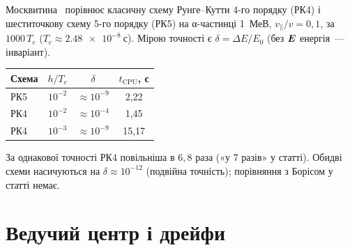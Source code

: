 \begin{corpusexample}
\noindent\begin{minipage}[c]{0.53\linewidth}
Москвитина~\cite{Moskvitina2010} порівнює класичну схему Рунге--Кутти 4-го порядку (РК4) і шеститочкову схему 5-го порядку (РК5) на α-частинці \SI{1}{МеВ}, $v_\parallel/v=0{,}1$, за $1000\,T_c$ ($T_c\approx\SI{2,48e-8}{с}$). Мірою точності є $\delta=\Delta E/E_0$ (без $\bm{E}$ енергія~--- інваріант).
\end{minipage}\hfill
\begin{minipage}[c]{0.44\linewidth}\centering\small
\begin{tabular}{@{}lccc@{}}
\toprule
Схема & $h/T_c$ & $\delta$ & $t_{\mathrm{CPU}}$, с \\
\midrule
РК5 & $10^{-2}$ & $\approx10^{-9}$ & 2,22 \\
РК4 & $10^{-2}$ & $\approx10^{-4}$ & 1,45 \\
РК4 & $10^{-3}$ & $\approx10^{-9}$ & 15,17 \\
\bottomrule
\end{tabular}
\end{minipage}\par\smallskip
За однакової точності РК4 повільніша в $6{,}8$ раза («у 7 разів» у статті). Обидві схеми насичуються на $\delta\approx10^{-12}$ (подвійна точність); порівняння з Борісом у статті немає.
\end{corpusexample}

\section{Ведучий центр і дрейфи}\label{sec:02-gc}

